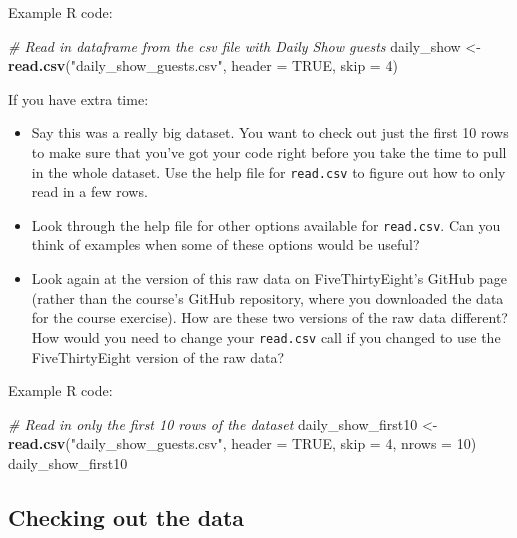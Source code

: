 \documentclass[]{book}
\makeatletter
\newenvironment{Shaded}{\begin{snugshade}}{\end{snugshade}}
\newcommand{\KeywordTok}[1]{\textcolor[rgb]{0.13,0.29,0.53}{\textbf{#1}}}
\newcommand{\DataTypeTok}[1]{\textcolor[rgb]{0.13,0.29,0.53}{#1}}
\newcommand{\DecValTok}[1]{\textcolor[rgb]{0.00,0.00,0.81}{#1}}
\newcommand{\StringTok}[1]{\textcolor[rgb]{0.31,0.60,0.02}{#1}}
\newcommand{\CommentTok}[1]{\textcolor[rgb]{0.56,0.35,0.01}{\textit{#1}}}
\newcommand{\OtherTok}[1]{\textcolor[rgb]{0.56,0.35,0.01}{#1}}
\newcommand{\NormalTok}[1]{#1}
\providecommand{\tightlist}{%
  \setlength{\itemsep}{0pt}\setlength{\parskip}{0pt}}
\newenvironment{kframe}{%
\medskip{}
\setlength{\fboxsep}{.8em}
 \def\at@end@of@kframe{}%
 \ifinner\ifhmode%
  \def\at@end@of@kframe{\end{minipage}}%
  \begin{minipage}{\columnwidth}%
 \fi\fi%
 \def\FrameCommand##1{\hskip\@totalleftmargin \hskip-\fboxsep
 \colorbox{shadecolor}{##1}\hskip-\fboxsep
     \hskip-\linewidth \hskip-\@totalleftmargin \hskip\columnwidth}%
 \MakeFramed {\advance\hsize-\width
   \@totalleftmargin\z@ \linewidth\hsize
   \@setminipage}}%
 {\par\unskip\endMakeFramed%
 \at@end@of@kframe}
\renewenvironment{Shaded}{\begin{kframe}}{\end{kframe}}
\theoremstyle{definition}
\theoremstyle{definition}
\theoremstyle{definition}
\theoremstyle{remark}
\makeatother
\begin{document}
Example R code:

\begin{Shaded}
\begin{Highlighting}[]
\CommentTok{# Read in dataframe from the csv file with Daily Show guests}
\NormalTok{daily_show <-}\StringTok{ }\KeywordTok{read.csv}\NormalTok{(}\StringTok{"daily_show_guests.csv"}\NormalTok{, }\DataTypeTok{header =} \OtherTok{TRUE}\NormalTok{, }\DataTypeTok{skip =} \DecValTok{4}\NormalTok{)}
\end{Highlighting}
\end{Shaded}

If you have extra time:

\begin{itemize}
\tightlist
\item
  Say this was a really big dataset. You want to check out just the
  first 10 rows to make sure that you've got your code right before you
  take the time to pull in the whole dataset. Use the help file for
  \texttt{read.csv} to figure out how to only read in a few rows.
\item
  Look through the help file for other options available for
  \texttt{read.csv}. Can you think of examples when some of these
  options would be useful?
\item
  Look again at the version of this raw data on FiveThirtyEight's GitHub
  page (rather than the course's GitHub repository, where you downloaded
  the data for the course exercise). How are these two versions of the
  raw data different? How would you need to change your
  \texttt{read.csv} call if you changed to use the FiveThirtyEight
  version of the raw data?
\end{itemize}

Example R code:

\begin{Shaded}
\begin{Highlighting}[]
\CommentTok{# Read in only the first 10 rows of the dataset}
\NormalTok{daily_show_first10 <-}\StringTok{ }\KeywordTok{read.csv}\NormalTok{(}\StringTok{"daily_show_guests.csv"}\NormalTok{, }\DataTypeTok{header =} \OtherTok{TRUE}\NormalTok{,}
                       \DataTypeTok{skip =} \DecValTok{4}\NormalTok{, }\DataTypeTok{nrows =} \DecValTok{10}\NormalTok{)}
\NormalTok{daily_show_first10}
\end{Highlighting}
\end{Shaded}

\subsection{Checking out the data}\label{checking-out-the-data}
\end{document}
